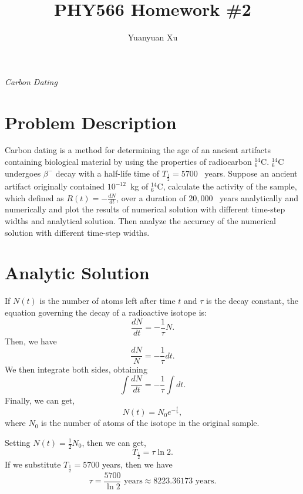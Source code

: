 \documentclass[a4paper]{article}
\title{\textbf{PHY566 Homework \#2}}
\author{Yuanyuan Xu}
\newcommand*\chem[1]{\ensuremath{\mathrm{#1}}}
\begin{document}
	\maketitle
	\centerline{\emph{\Large{Carbon Dating}}}
	\section{Problem Description}
	Carbon dating is a method for determining the age of an ancient artifacts containing biological material by using the properties of radiocarbon \chem{^{14}_{6}C}. \chem{^{14}_{6}C} undergoes ${\beta}^{-}$ decay with a half-life time of $T_{\frac{1}{2}} = 5700$ ~years. Suppose an ancient artifact originally contained $10^{-12}$~kg of \chem{^{14}_{6}C}, calculate the activity of the sample, which defined as $R(t) = - \frac{dN}{dt}$, over a duration of $20,000$ ~years analytically and numerically and plot the results of numerical solution with different time-step widths and analytical solution. Then analyze the accuracy of the numerical solution with different time-step widths. 
	
	\section{Analytic Solution}
	If $N(t)$ is the number of atoms left after time $t$ and $\tau$ is the decay constant, the equation governing the decay of a radioactive isotope is:
	\begin{equation}  \label{ode}
			\frac{dN}{dt} = - \frac{1}{\tau}N.
	\end{equation}	
	Then, we have
	\begin{equation}
		\frac{dN}{N} = -\frac{1}{\tau}dt.
	\end{equation}
	We then integrate both sides, obtaining
	\begin{equation}
		\int{\frac{dN}{dt}} = - \frac{1}{\tau}\int{dt}.
	\end{equation}
	Finally, we can get,
	\begin{equation}
		N(t) = N_0  e^{- \frac{t}{\tau}},
	\end{equation}
	where $N_0$ is the number of atoms of the isotope in the original sample.
	
	
	Setting $N(t) = \frac{1}{2}N_0$, then we can get,
	\begin{equation}
		T_{\frac{1}{2}} = \tau \ln{2}.
	\end{equation}
	If we substitute $T_{\frac{1}{2}} = 5700$ years, then we have
	\begin{equation}
		\tau = \frac{5700}{\ln{2}} \textrm{~years} \approx 8223.36173 \textrm{~years.}
	\end{equation}
	
\end{document}
